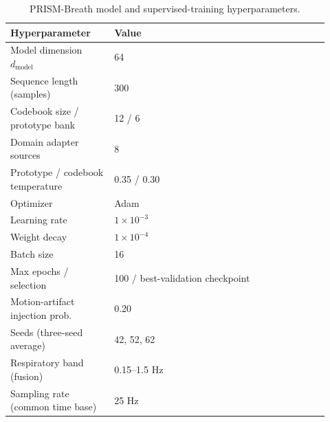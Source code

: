 \documentclass[journal]{IEEEtran}
\begin{document}
\begin{table}[!t]
\caption{PRISM-Breath model and supervised-training hyperparameters.}
\label{tab:s5}\centering\small
\begin{tabular}{@{}p{0.30\linewidth}p{0.62\linewidth}@{}}\toprule
Hyperparameter & Value\\\midrule
Model dimension $d_{\text{model}}$ & 64 \\
Sequence length (samples) & 300 \\
Codebook size / prototype bank & 12 / 6 \\
Domain adapter sources & 8 \\
Prototype / codebook temperature & 0.35 / 0.30 \\
Optimizer & Adam \\
Learning rate & $1{\times}10^{-3}$ \\
Weight decay & $1{\times}10^{-4}$ \\
Batch size & 16 \\
Max epochs / selection & 100 / best-validation checkpoint \\
Motion-artifact injection prob. & 0.20 \\
Seeds (three-seed average) & 42, 52, 62 \\
Respiratory band (fusion) & 0.15--1.5 Hz \\
Sampling rate (common time base) & 25 Hz \\\bottomrule
\end{tabular}
\end{table}
\end{document}
